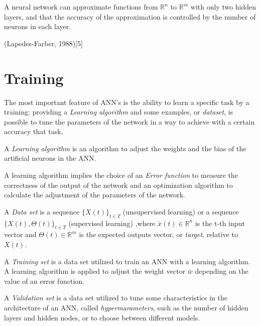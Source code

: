 \begin{theo}
	A  neural network can approximate functions  from $\mathbb{R}^n$ to $\mathbb{R}^m$ with only two hidden layers, and that the accuracy of the approximation is controlled by the number of neurons in each layer.
\end{theo}
(Lapedes-Farber, 1988)[5]

\newpage
\section{Training}
The most important feature of ANN's is the ability to learn a specific task by a training: providing a \emph{Learning algorithm} and some examples, or \emph{dataset}, is possible to tune the parameters of the network in a way to achieve with a certain accuracy that task.

\begin{defn}
A \emph{Learning algorithm} is an algorithm to adjust the weights and the bias of the artificial neurons in the ANN.
\end{defn}

A learning algorithm implies the choice of an \emph{Error function} to measure the correctness of the output of the network and an optimization algorithm to calculate the adjustment of the parameters of the network.




\begin{defn}
	A \emph{Data set} is a sequence  $\{ X(t) \}_{t \in T}$ (unsupervised learning) or a sequence $\{X(t), \Theta(t)\}_{t \in T}$ (supervised learning) ,where $\bar{x}(t) \in \mathbb{R}^n $ is the t-th input vector and $\Theta(t) \in \mathbb{R}^m$ is the expected outputs vector, or \emph{target}, relative to $X(t)$.
\end{defn}

\begin{defn}
A \emph{Training set} is a data set utilized to train an ANN with a learning algorithm.\\
A learning algorithm is applied to adjust the weight vector $\bar{w}$ depending on the value of an error function.
\end{defn}

\begin{defn}
A \emph{Validation set} is a data set utilized to tune some characteristics in the architecture of an ANN, called \emph{hypermarameters}, such as  the number of hidden layers and hidden nodes, or to choose between different models.
\end{defn}

